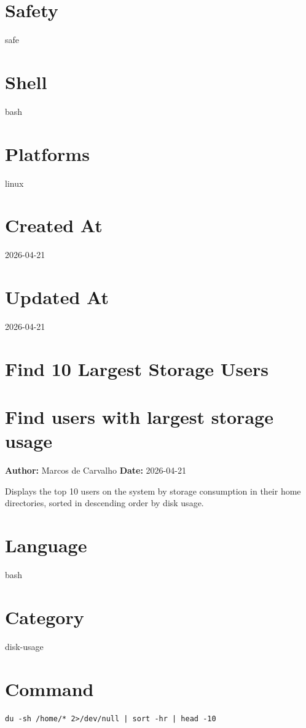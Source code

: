\documentclass[openany]{book}
\begin{document}
\section*{Safety}
safe

\section*{Shell}
bash

\section*{Platforms}
linux

\section*{Created At}
2026-04-21

\section*{Updated At}
2026-04-21

\section{Find 10 Largest Storage Users}
\section*{Find users with largest storage usage}
\textbf{Author:} Marcos de Carvalho \hfill \textbf{Date:} 2026-04-21

\noindent Displays the top 10 users on the system by storage consumption in their home directories, sorted in descending order by disk usage.

\section*{Language}
bash

\section*{Category}
disk-usage

\section*{Command}
\begin{lstlisting}
du -sh /home/* 2>/dev/null | sort -hr | head -10
\end{lstlisting}
\end{document}
